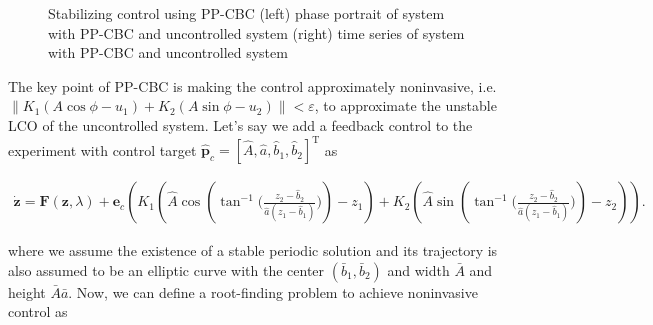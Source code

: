\documentclass[openacc]{rsproca_new}%
\theoremstyle{own}
\def\epsilon{\varepsilon}
\def\vec#1{\ensuremath{\mathbf{#1}}}
\begin{document}
\begin{figure}
  \centering
  \hspace*{-0.3em}
  \caption{Stabilizing control using PP-CBC (left) phase portrait of system with PP-CBC and uncontrolled system (right) time series of system with PP-CBC and uncontrolled system}
\end{figure}\label{pp_CBC}

The key point of PP-CBC is making the control approximately noninvasive, i.e. $\|K_1(A \cos \phi-u_1)+K_2(A \sin \phi-u_2)\|<\epsilon$, to approximate the unstable LCO of the uncontrolled system. Let's say we add a feedback control to the experiment with control target $\hat {\vec p}_c=[\hat A,\hat a,\hat b_1,\hat b_2]^\textrm{T}$ as

\begin{align}\label{CBC+2}
\dot{\vec{z}}= \vec F(\vec{z},\lambda)+\vec e_c (K_1(\hat A\cos(\tan^{-1}\Big(\frac{z_2-\hat b_2}{\hat a(z_1-\hat b_1)}\Big))-z_1)+ K_2(\hat A\sin(\tan^{-1}\Big(\frac{z_2-\hat b_2}{\hat a(z_1-\hat b_1)}\Big)) -z_2)).
\end{align}

\noindent where we assume the existence of a stable periodic solution and its trajectory is also assumed to be an elliptic curve with the center $(\bar b_1,\bar b_2)$ and width $\bar A$ and height $\bar A \bar a$. Now, we can define a root-finding problem to achieve noninvasive control as
\end{document}
